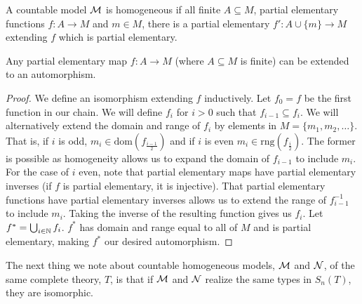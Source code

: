 \begin{definition}\label{definition_homogeneity}
A countable model \(\mathcal{M}\) is homogeneous if all finite \(A \subseteq M\), partial elementary functions \(f: A \to M\) and \(m \in M\), there is a partial elementary \(f': A \cup \{m\} \to M\) extending \(f\) which is partial elementary. 
\end{definition}

\begin{theorem}\label{theorem_partial_elementary_automorphism}
Any partial elementary map \(f: A \to M\) (where \(A \subseteq M\) is finite) can be extended to an automorphism. 
\end{theorem}

\begin{proof}
We define an isomorphism extending \(f\) inductively. 
Let \(f_0 = f\) be the first function in our chain.
We will define \(f_i\) for \(i > 0\) such that \(f_{i-1} \subseteq f_i\).
We will alternatively extend the domain and range of \(f_i\) by elements in \(M = \{m_1, m_2, \ldots\}\).
That is, if \(i\) is odd, \(m_i \in \text{dom}(f_{\frac{i-1}{2}})\) and if \(i\) is even \(m_i \in \text{rng}(f_{\frac{i}{2}})\).
The former is possible as homogeneity allows us to expand the domain of \(f_{i-1}\) to include \(m_i\).
For the case of \(i\) even, note that partial elementary maps have partial elementary inverses (if \(f\) is partial elementary, it is injective). 
That partial elementary functions have partial elementary inverses allows us to extend the range of \(f_{i-1}^{-1}\) to include \(m_i\). 
Taking the inverse of the resulting function gives us \(f_i\).
Let \(f^* = \bigcup_{i \in \mathbb{N}}f_i\).
\(f^*\) has domain and range equal to all of \(M\) and is partial elementary, making \(f^*\) our desired automorphism.
\end{proof}



\begin{lemma}\label{lemma_types_isomorphism}
The next thing we note about countable homogeneous models, \(\mathcal{M}\) and \(\mathcal{N}\), of the same complete theory, \(T\), is that if \(\mathcal{M}\) and \(\mathcal{N}\) realize the same types in \(S_n(T)\), they are isomorphic.
\end{lemma}

